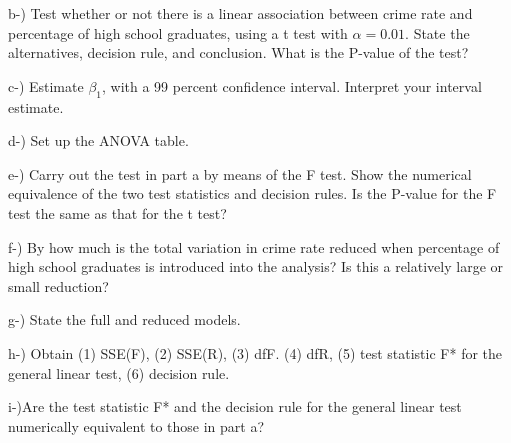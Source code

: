 \documentclass[]{article}
\begin{document}
b-) Test whether or not there is a linear association between crime rate
and percentage of high school graduates, using a t test with
\(\alpha =0.01\). State the alternatives, decision rule, and conclusion.
What is the P-value of the test?

c-) Estimate \(\beta_{1}\), with a 99 percent confidence interval.
Interpret your interval estimate.

d-) Set up the ANOVA table.

e-) Carry out the test in part a by means of the F test. Show the
numerical equivalence of the two test statistics and decision rules. Is
the P-value for the F test the same as that for the t test?

f-) By how much is the total variation in crime rate reduced when
percentage of high school graduates is introduced into the analysis? Is
this a relatively large or small reduction?

g-) State the full and reduced models.

h-) Obtain (1) SSE(F), (2) SSE(R), (3) dfF. (4) dfR, (5) test statistic
F* for the general linear test, (6) decision rule.

i-)Are the test statistic F* and the decision rule for the general
linear test numerically equivalent to those in part a?
\end{document}
